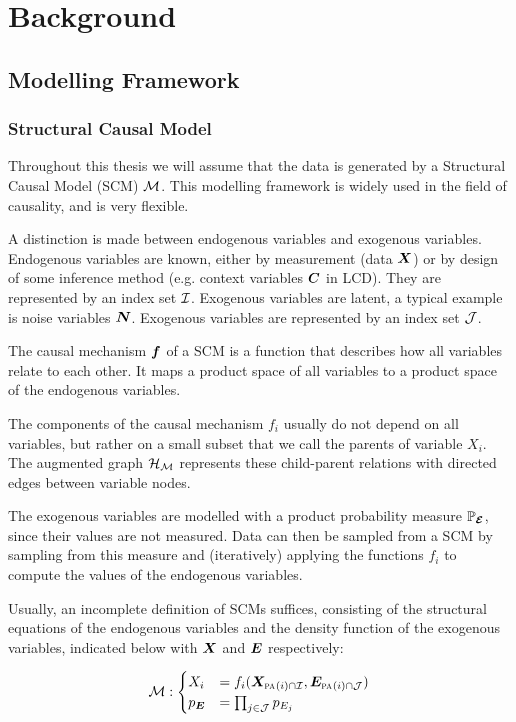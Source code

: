 \newpage
\section{Background}

\subsection{Modelling Framework}

\subsubsection{Structural Causal Model}
Throughout this thesis we will assume that the data is generated by a Structural Causal Model (SCM) $\mathcal{M}$. This modelling framework is widely used in the field of causality, and is very flexible. 

A distinction is made between endogenous variables and exogenous variables. Endogenous variables are known, either by measurement (data $\bm{X}$) or by design of some inference method (e.g. context variables $\bm{C}$ in LCD). They are represented by an index set $\mathcal{I}$. Exogenous variables are latent, a typical example is noise variables $\bm{N}$. Exogenous variables are represented by an index set $\mathcal{J}$.

The causal mechanism $\bm{f}$ of a SCM is a function that describes how all variables relate to each other. It maps a product space of all variables to a product space of the endogenous variables. 

The components of the causal mechanism $f_i$ usually do not depend on all variables, but rather on a small subset that we call the parents of variable $X_i$. The augmented graph $\mathcal{H}_{\mathcal{M}}$ represents these child-parent relations with directed edges between variable nodes.

The exogenous variables are modelled with a product probability measure $\mathbb{P}_{\bm{\mathcal{E}}}$, since their values are not measured. Data can then be sampled from a SCM by sampling from this measure and (iteratively) applying the functions $f_i$ to compute the values of the endogenous variables.

Usually, an incomplete definition of SCMs suffices, consisting of the structural equations of the endogenous variables and the density function of the exogenous variables, indicated below with $\bm{X}$ and $\bm{E}$ respectively:

$$\mathcal{M}: \begin{cases}
    X_i &= f_i(\bm{X}_{\text{\normalfont\scshape pa}_{}(i) \cap \mathcal{I}}, \bm{E}_{\text{\normalfont\scshape pa}_{}(i) \cap \mathcal{J}}) \\
    p_{\bm{E}} & = \prod_{j\in\mathcal{J}} p_{E_j}
\end{cases}$$

